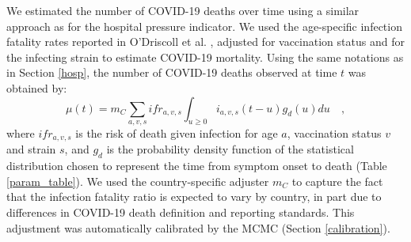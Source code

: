 We estimated the number of COVID-19 deaths over time using a similar approach 
as for the hospital pressure indicator. We used the age-specific infection fatality rates reported in
O'Driscoll et al. \cite{odriscoll-2021}, adjusted for vaccination status and for the infecting strain
to estimate COVID-19 mortality. Using the same notations as in Section \ref{hosp}, the number of COVID-19
deaths observed at time $t$ was obtained by:
\begin{equation}
\mu(t) = m_C \sum_{a,v,s} ifr_{a,v,s} \int_{u \geq 0}  i_{a,v,s}(t-u)g_{d}(u) du   \quad,
\end{equation}
where $ifr_{a,v,s}$ is the risk of death given infection for age $a$, vaccination status $v$ and strain $s$, 
and $g_d$ is the probability density function of the statistical distribution chosen to represent the 
time from symptom onset to death (Table \ref{param_table}). We used the country-specific adjuster $m_C$ to 
capture the fact that the infection fatality ratio is expected to vary by country, in part due to 
differences in COVID-19 death definition and reporting standards. This adjustment was automatically calibrated 
by the MCMC (Section \ref{calibration}).